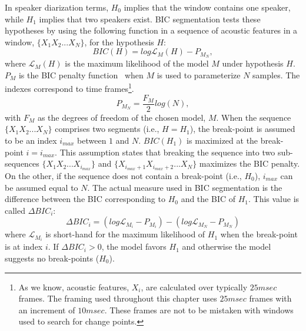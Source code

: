 In speaker diarization terms, $H_0$ implies that the window contains one speaker, while $H_1$ implies that two speakers exist. 
BIC segmentation tests these hypotheses by using the following function in a sequence of acoustic features in a window, $\{X_1X_2...X_N\}$, for the hypothesis $H$:
\begin{equation}
BIC(H) = log\mathcal{L}_{M}(H) - P_{M_{N}}, 
\end{equation}
where $\mathcal{L}_{M}(H)$ is the maximum likelihood of the model $M$ under hypothesis $H$. $P_M$ is the BIC penalty function~\cite{schwarz1978BIC} when $M$ is used to parameterize $N$ samples. The indexes correspond to time frames\footnote{As we know, acoustic features, $X_i$, are calculated over typically $25 msec$ frames. 
The framing used throughout this chapter uses $25 msec$ frames with an increment of $10 msec$. These frames are not to be mistaken with windows used to search for change points.}. 
\begin{equation}
P_{M_N} = \frac{F_M}{2}log(N),
\end{equation}
with $F_M$ as the degrees of freedom of the chosen model, $M$. 
When the sequence $\{X_1X_2...X_N\}$ comprises two segments (i.e., $H = H_1$), the break-point is assumed to be an index $i_{max}$ between $1$ and $N$. 
$BIC(H_1)$ is maximized at the break-point $i = i_{max}$. 
This assumption states that breaking the sequence into two sub-sequences $\{X_1X_2...X_{i_{max}}\}$ and $\{X_{i_{max}+1}X_{i_{max}+2}...X_N\}$ maximizes the BIC penalty. 
On the other, if the sequence does not contain a break-point (i.e., $H_0$), $i_{max}$ can be assumed equal to $N$. 
The actual measure used in BIC segmentation is the difference between the BIC corresponding to $H_0$ and the BIC of $H_1$. This value is called $\Delta BIC_i$: 
\begin{equation}
\Delta BIC_i = (log \mathcal{L}_{M_i} - P_{M_i}) - (log \mathcal{L}_{M_N} - P_{M_N})
\end{equation}
where $\mathcal{L}_{M_i}$ is short-hand for the maximum likelihood of $H_1$ when the break-point is at index $i$. 
If $\Delta BIC_i > 0$, the model favors $H_1$ and otherwise the model suggests no break-points ($H_0$).  

